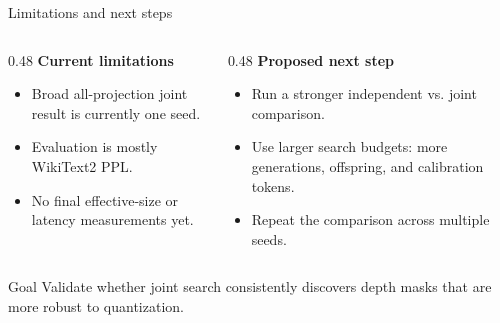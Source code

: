 \documentclass[aspectratio=169]{beamer}
\begin{document}

\begin{frame}{Limitations and next steps}
\begin{columns}[T]
\begin{column}{0.48\textwidth}
\textbf{Current limitations}
\begin{itemize}
    \item Broad all-projection joint result is currently one seed.
    \item Evaluation is mostly WikiText2 PPL.
    \item No final effective-size or latency measurements yet.
\end{itemize}
\end{column}

\begin{column}{0.48\textwidth}
\textbf{Proposed next step}
\begin{itemize}
    \item Run a stronger independent vs. joint comparison.
    \item Use larger search budgets: more generations, offspring, and calibration tokens.
    \item Repeat the comparison across multiple seeds.
\end{itemize}
\end{column}
\end{columns}

\vspace{0.25cm}
\begin{block}{Goal}
Validate whether joint search consistently discovers depth masks that are more robust to quantization.
\end{block}
\end{frame}

\end{document}
